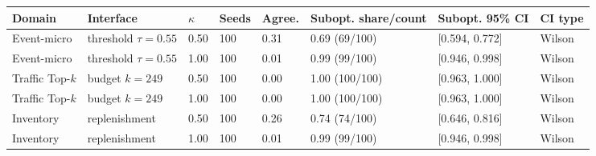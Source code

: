 \begin{tabular}{llllllll}
\toprule
Domain & Interface & $\kappa$ & Seeds & Agree. & Subopt. share/count & Subopt. 95\% CI & CI type \\
\midrule
Event-micro & threshold $\tau=0.55$ & 0.50 & 100 & 0.31 & 0.69 (69/100) & [0.594, 0.772] & Wilson \\
Event-micro & threshold $\tau=0.55$ & 1.00 & 100 & 0.01 & 0.99 (99/100) & [0.946, 0.998] & Wilson \\
Traffic Top-\(k\) & budget $k=249$ & 0.50 & 100 & 0.00 & 1.00 (100/100) & [0.963, 1.000] & Wilson \\
Traffic Top-\(k\) & budget $k=249$ & 1.00 & 100 & 0.00 & 1.00 (100/100) & [0.963, 1.000] & Wilson \\
Inventory & replenishment & 0.50 & 100 & 0.26 & 0.74 (74/100) & [0.646, 0.816] & Wilson \\
Inventory & replenishment & 1.00 & 100 & 0.01 & 0.99 (99/100) & [0.946, 0.998] & Wilson \\
\bottomrule
\end{tabular}
